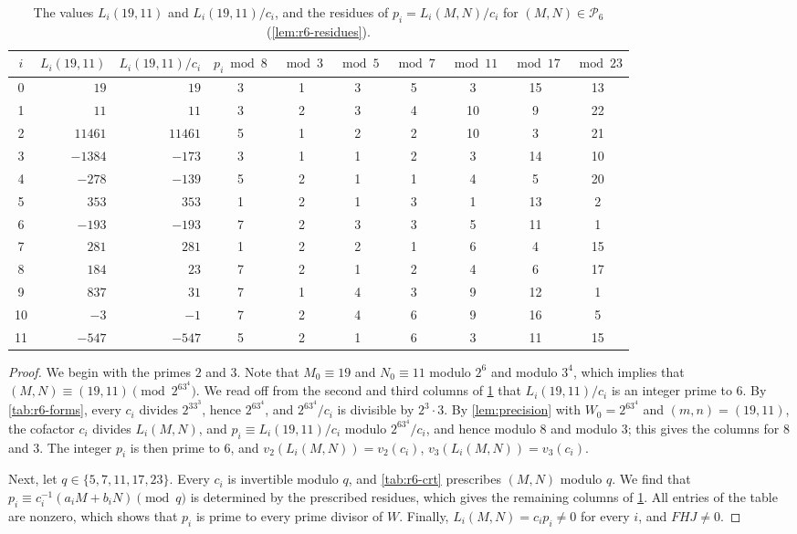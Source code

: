 \documentclass[12pt,oneside,openany]{book}
\theoremstyle{definition}
\theoremstyle{plain}
\numberwithin{equation}{chapter}
\theoremstyle{plain}
\theoremstyle{definition}
\theoremstyle{remark}
\newcommand{\cP}{\mathcal P}
\begin{document}
\begin{table}[htbp]
\centering
\caption{The values $L_i(19,11)$ and $L_i(19,11)/c_i$, and the residues of $p_i=L_i(M,N)/c_i$ for $(M,N)\in\cP_6$ (\cref{lem:r6-residues}).}
\label{tab:r6-residues} \setlength{\tabcolsep}{4pt}
\begin{tabular}{crrccccccc}
\toprule
$i$ & $L_i(19,11)$ & $L_i(19,11)/c_i$ & $p_i\bmod8$ & $\bmod3$ & $\bmod5$ & $\bmod7$ & $\bmod11$ & $\bmod17$ & $\bmod23$\\
\midrule
0 & $19$ & $19$ & 3 & 1 & 3 & 5 & 3 & 15 & 13 \\
1 & $11$ & $11$ & 3 & 2 & 3 & 4 & 10 & 9 & 22 \\
2 & $11461$ & $11461$ & 5 & 1 & 2 & 2 & 10 & 3 & 21 \\
3 & $-1384$ & $-173$ & 3 & 1 & 1 & 2 & 3 & 14 & 10 \\
4 & $-278$ & $-139$ & 5 & 2 & 1 & 1 & 4 & 5 & 20 \\
5 & $353$ & $353$ & 1 & 2 & 1 & 3 & 1 & 13 & 2 \\
6 & $-193$ & $-193$ & 7 & 2 & 3 & 3 & 5 & 11 & 1 \\
7 & $281$ & $281$ & 1 & 2 & 2 & 1 & 6 & 4 & 15 \\
8 & $184$ & $23$ & 7 & 2 & 1 & 2 & 4 & 6 & 17 \\
9 & $837$ & $31$ & 7 & 1 & 4 & 3 & 9 & 12 & 1 \\
10 & $-3$ & $-1$ & 7 & 2 & 4 & 6 & 9 & 16 & 5 \\
11 & $-547$ & $-547$ & 5 & 2 & 1 & 6 & 3 & 11 & 15 \\
\bottomrule
\end{tabular}
\end{table}

\begin{proof}
We begin with the primes $2$ and $3$. Note that $M_0\equiv19$ and $N_0\equiv11$ modulo $2^6$ and modulo $3^4$, which implies that $(M,N)\equiv(19,11)\pmod{2^63^4}$. We read off from the second and third columns of \cref{tab:r6-residues} that $L_i(19,11)/c_i$ is an integer prime to $6$. By \cref{tab:r6-forms}, every $c_i$ divides $2^33^3$, hence $2^63^4$, and $2^63^4/c_i$ is divisible by $2^3\cdot3$. By \cref{lem:precision} with $W_0=2^63^4$ and $(m,n)=(19,11)$, the cofactor $c_i$ divides $L_i(M,N)$, and $p_i\equiv L_i(19,11)/c_i$ modulo $2^63^4/c_i$, and hence modulo $8$ and modulo $3$; this gives the columns for $8$ and $3$. The integer $p_i$ is then prime to $6$, and $v_2(L_i(M,N))=v_2(c_i)$, $v_3(L_i(M,N))=v_3(c_i)$.

Next, let $q\in\{5,7,11,17,23\}$. Every $c_i$ is invertible modulo $q$, and \cref{tab:r6-crt} prescribes $(M,N)$ modulo $q$. We find that $p_i\equiv c_i^{-1}(a_iM+b_iN)\pmod q$ is determined by the prescribed residues, which gives the remaining columns of \cref{tab:r6-residues}. All entries of the table are nonzero, which shows that $p_i$ is prime to every prime divisor of $W$. Finally, $L_i(M,N)=c_ip_i\ne0$ for every $i$, and $FHJ\ne0$.
\end{proof}
\end{document}
